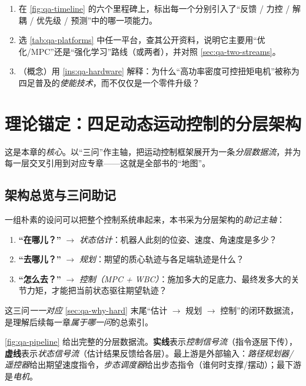 \begin{practice}
\begin{enumerate}
  \item 在 \cref{fig:qa-timeline} 的六个里程碑上，标出每一个分别引入了“反馈 / 力控 / 解耦 / 优先级 / 预测”中的哪一项能力。
  \item 选 \cref{tab:qa-platforms} 中任一平台，查其公开资料，说明它主要用“优化/MPC”还是“强化学习”路线（或两者），并对照 \cref{sec:qa-two-streams}。
  \item （概念）用 \cref{ins:qa-hardware} 解释：为什么“高功率密度可控扭矩电机”被称为四足普及的\emph{使能技术}，而不仅仅是一个零件升级？
\end{enumerate}
\end{practice}

\section{理论锚定：四足动态运动控制的分层架构}
\label{sec:qa-arch}

这是本章的\emph{核心}。以“三问”作主轴，把运动控制框架展开为一条\emph{分层数据流}，并为每一层交叉引用到对应专章——这就是全部书的“地图”\cite{yu2021quadruped}。

\subsection{架构总览与三问助记}
\label{subsec:qa-overview}

\begin{insight}\label{ins:qa-three-questions}
一组朴素的设问可以把整个控制系统串起来，本书采为分层架构的\emph{助记主轴}：
\begin{enumerate}
  \item \textbf{“在哪儿？”} $\to$ \emph{状态估计}：机器人此刻的位姿、速度、角速度是多少？
  \item \textbf{“去哪儿？”} $\to$ \emph{规划}：期望的质心轨迹与各足端轨迹是什么？
  \item \textbf{“怎么去？”} $\to$ \emph{控制（MPC + WBC）}：施加多大的足底力、最终发多大的关节力矩，才能把当前状态驱往期望轨迹？
\end{enumerate}
这三问\emph{一一对应} \cref{sec:qa-why-hard} 末尾“估计 $\to$ 规划 $\to$ 控制”的闭环数据流，是理解后续每一章\emph{属于哪一问}的总索引\cite{yu2021quadruped}。
\end{insight}

\cref{fig:qa-pipeline} 给出完整的分层数据流。\textbf{实线}表示\emph{控制信号流}（指令逐层下传），\textbf{虚线}表示\emph{状态信号流}（估计结果反馈给各层）。最上游是外部输入：\emph{路径规划器/遥控器}给出期望速度指令，\emph{步态调度器}给出步态指令（谁何时支撑/摆动）；最下游是\emph{电机}\cite{yu2021quadruped}。

